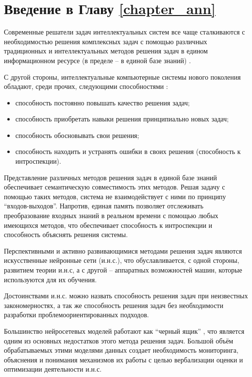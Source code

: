 \section*{Введение в Главу \ref{chapter_ann}}

Современные решатели задач интеллектуальных систем все чаще сталкиваются с необходимостью решения комплексных задач с помощью различных традиционных и интеллектуальных методов решения задач в едином информационном ресурсе (в пределе -- в единой базе знаний) .

С другой стороны, интеллектуальные компьютерные системы нового поколения обладают, среди прочих, следующими способностями :
\begin{itemize}
	\item способность постоянно повышать качество решения задач;
	\item способность приобретать навыки решения принципиально новых задач;
	\item способность обосновывать свои решения;
	\item способность находить и устранять ошибки в своих решения (способность к интроспекции).
\end{itemize}

Представление различных методов решения задач в единой базе знаний обеспечивает семантическую совместимость этих методов. Решая задачу с помощью таких методов, система не взаимодействует с ними по принципу ``входов-выходов''. Напротив, единая память позволяет отслеживать преобразование входных знаний в реальном времени с помощью любых имеющихся методов, что обеспечивает способность к интроспекции и способность объяснять решения системы.

Перспективными и активно развивающимися методами решения задач являются искусственные нейронные сети (и.н.с.), что обуславливается, с одной стороны, развитием теории и.н.с, а с другой -- аппаратных возможностей машин, которые используются для их обучения.

Достоинствами и.н.с. можно назвать способность решения задач при неизвестных закономерностях, а так же способность решения задач без необходимости разработки проблемоориентированных подходов.

Большинство нейросетевых моделей работают как ``черный ящик'' , что является одним из основных недостатков этого метода решения задач. Большой объём обрабатываемых этими моделями данных создает необходимость мониторинга, объяснения и понимания механизмов их работы с целью вербализации оценки и оптимизации деятельности и.н.с.

